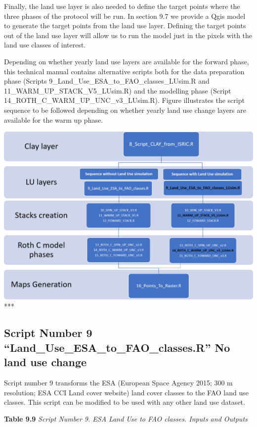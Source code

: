 \documentclass[
  10pt,
  b5paper,
]{book}
\begin{document}
Finally, the land use layer is also needed to define the target points where the three phases of the protocol will be run. In section 9.7 we provide a Qgis model to generate the target points from the land use layer. Defining the target points out of the land use layer will allow us to run the model just in the pixels with the land use classes of interest.

Depending on whether yearly land use layers are available for the forward phase, this technical manual contains alternative scripts both for the data preparation phase (Scripts 9\_Land\_Use\_ESA\_to\_FAO\_classes\_LUsim.R and 11\_WARM\_UP\_STACK\_V5\_LUsim.R) and the modelling phase (Script 14\_ROTH\_C\_WARM\_UP\_UNC\_v3\_LUsim.R). Figure illustrates the script sequence to be followed depending on whether yearly land use change layers are available for the warm up phase.

\includegraphics{images/Figure_9.6.png}
***

\hypertarget{script-number-9-land_use_esa_to_fao_classes.r-no-land-use-change}{%
\subsection{Script Number 9 ``Land\_Use\_ESA\_to\_FAO\_classes.R'' No land use change}\label{script-number-9-land_use_esa_to_fao_classes.r-no-land-use-change}}

Script number 9 transforms the ESA (European Space Agency 2015; 300 m resolution; ESA CCI Land cover website) land cover classes to the FAO land use classes. This script can be modified to be used with any other land use dataset.

\textbf{Table 9.9} \emph{Script Number 9. ESA Land Use to FAO classes. Inputs and Outputs}
\end{document}
